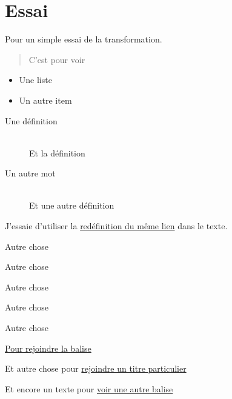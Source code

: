% 
% 
% 
% 
% 
% 
% 
% 

\section{Essai}\hypertarget{essai}{}\label{essai}


Pour un simple essai de la transformation.

\begin{quote}
C'est pour voir
\end{quote}

\begin{itemize}
\item Une liste
\item Un autre item
\end{itemize}

\begin{description}
\item[Une définition] \hfill \\
 Et la définition



\item[Un autre mot] \hfill \\
 Et une autre définition
\end{description}

J'essaie d'utiliser la \href{http://laboiteaoutilsdelauteur.fr/analyse/31/show}{redéfinition du même lien} dans le texte.

Autre chose

Autre chose

Autre chose

Autre chose

Autre chose

\hyperlink{pour-voir-la-balise}{Pour rejoindre la balise }

Et autre chose pour \hyperlink{specific-id-pour-essai}{rejoindre un titre particulier}

Et encore un texte pour \hyperlink{pour-voir-une-autre-balise}{voir une autre balise}

